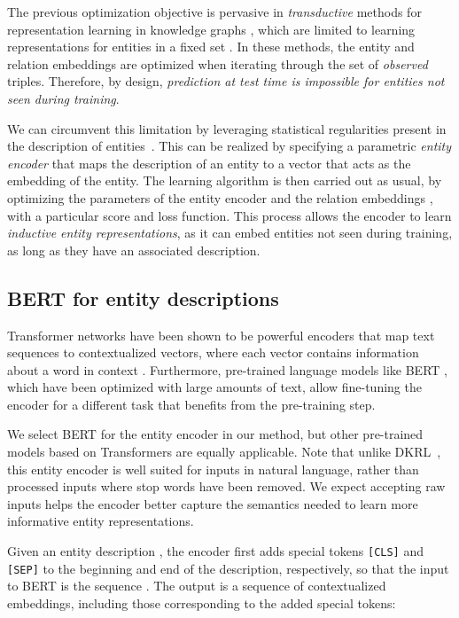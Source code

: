 \documentclass[sigconf]{acmart}
\begin{document}
The previous optimization objective is pervasive in \textit{transductive} methods for representation learning in knowledge graphs \citep{nickel2015review,wang2017knowledge,ruffinelli2020you}, which are limited to learning representations for entities in a fixed set . In these methods, the entity and relation embeddings are optimized when iterating through the set of \textit{observed} triples. Therefore, by design, {\em prediction at test time is impossible for entities not seen during training}.

We can circumvent this limitation by leveraging statistical regularities present in the description of entities~\citep{xie2016RepresentationLO,shi2018open,wang2019tackling,wang2019kepler}. This can be realized by specifying a parametric \textit{entity encoder}  that maps the description  of an entity to a vector  that acts as the embedding of the entity. The learning algorithm is then carried out as usual, by optimizing the parameters  of the entity encoder and the relation embeddings , with a particular score and loss function. This process allows the encoder to learn \textit{inductive entity representations}, as it can embed entities not seen during training, as long as they have an associated description.

\subsection{BERT for entity descriptions}
\label{sec:blpdef}

Transformer networks \citep{vaswani2017attention} have been shown to be powerful encoders that map text sequences to contextualized vectors, where each vector contains information about a word in context \citep{ethayarajh2019contextual}. Furthermore, pre-trained language models like BERT \citep{devlin2019bert}, which have been optimized with large amounts of text, allow fine-tuning the encoder for a different task that benefits from the pre-training step.

We select BERT for the entity encoder in our method, but other pre-trained models based on Transformers are equally applicable. Note that unlike DKRL~\cite{xie2016RepresentationLO}, this entity encoder is well suited for inputs in natural language, rather than processed inputs where stop words have been removed. We expect accepting raw inputs helps the encoder better capture the semantics needed to learn more informative entity representations.

Given an entity description , the encoder first adds special tokens \texttt{[CLS]} and \texttt{[SEP]} to the beginning and end of the description, respectively, so that the input to BERT is the sequence . The output is a sequence of  contextualized embeddings, including those corresponding to the added special tokens:
\end{document}
